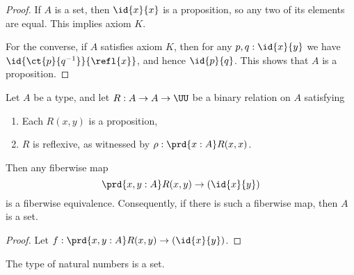 \begin{proof}
If $A$ is a set, then $\id{x}{x}$ is a proposition, so any two of its elements are equal. 
This implies axiom $K$. 

For the converse, if $A$ satisfies axiom $K$, then for any $p,q:\id{x}{y}$ we have $\id{\ct{p}{q^{-1}}}{\refl{x}}$, and hence $\id{p}{q}$. This shows that $A$ is a proposition.
\end{proof}

\begin{lem}\label{lem:prop_to_id}
Let $A$ be a type, and let $R:A\to A\to\UU$ be a binary relation on $A$ satisfying
\begin{enumerate}
\item Each $R(x,y)$ is a proposition,
\item $R$ is reflexive, as witnessed by $\rho:\prd{x:A}R(x,x)$.
\end{enumerate}
Then any fiberwise map
\begin{equation*}
\prd{x,y:A}R(x,y)\to (\id{x}{y})
\end{equation*}
is a fiberwise equivalence. Consequently, if there is such a fiberwise map, then $A$ is a set.
\end{lem}

\begin{proof}
Let $f:\prd{x,y:A}R(x,y)\to(\id{x}{y})$. 
\end{proof}

\begin{thm}
The type of natural numbers is a set.
\end{thm}

